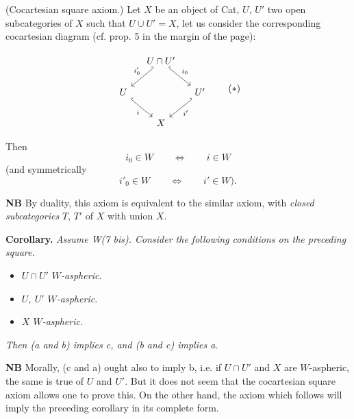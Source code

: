 \documentclass[11pt]{article}
\newcommand{\printedpage}[1]{\marginpar{\footnotesize p.~#1}}
\newcommand{\msp}[1]{\marginpar{\footnotesize [#1]}}
\begin{document}
\begin{description}[leftmargin=5em, style=nextline]
\item[W(7 bis)] (Cocartesian square axiom.) Let $X$ be an object of Cat, $U$, $U'$ two open subcategories of $X$ such that $U\cup U'=X$, let us consider the corresponding cocartesian diagram (cf. prop. 5 in the margin of the page):

\msp{page 76}
\[
\begin{tikzcd}[column sep=small]
& U\cap U' \arrow[dl, hook', "i'_0"'] \arrow[dr, hook, "i_0"] & \\
U \arrow[dr, hook, "i"'] & & U' \arrow[dl, hook', "i'"] \\
& X &
\end{tikzcd}
\tag*{$(*)$}
\]

Then
\[
i_0\in W\qquad\Longleftrightarrow\qquad i\in W
\]
(and symmetrically
\[
i'_0\in W\qquad\Longleftrightarrow\qquad i'\in W).
\]
\end{description}

\textbf{NB} By duality, this axiom is equivalent to the similar axiom, with \textit{closed subcategories} $T$, $T'$ of $X$ with union $X$.

\textbf{Corollary.} \textit{Assume \textup{W(7 bis)}. Consider the following conditions on the preceding square.}

\begin{itemize}
\item[\textit{a)}] \textit{$U\cap U'$ $W$-aspheric.}
\item[\textit{b)}] \textit{$U$, $U'$ $W$-aspheric.}
\item[\textit{c)}] \textit{$X$ $W$-aspheric.}
\end{itemize}

\textit{Then (a and b) implies c, and (b and c) implies a.}

\textbf{NB} Morally, (c and a) ought also to imply b, i.e. if $U\cap U'$ and $X$ are $W$-aspheric, the same is true of $U$ and $U'$. But it does not seem that the cocartesian square axiom allows one to prove this. On the other hand, the axiom which follows will imply the preceding corollary in its complete form.

\printedpage{56}
\end{document}
